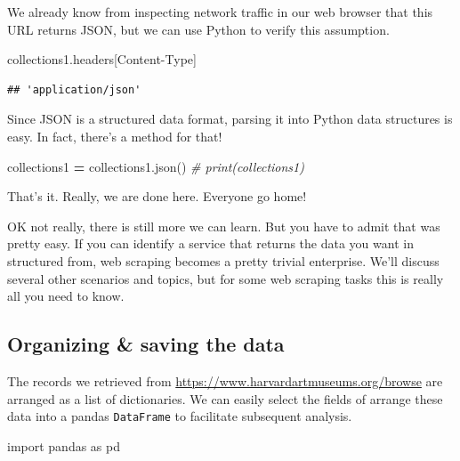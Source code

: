 \documentclass[
]{book}
\newenvironment{Shaded}{\begin{snugshade}}{\end{snugshade}}
\newcommand{\CommentTok}[1]{\textcolor[rgb]{0.56,0.35,0.01}{\textit{#1}}}
\newcommand{\ImportTok}[1]{#1}
\newcommand{\NormalTok}[1]{#1}
\newcommand{\OperatorTok}[1]{\textcolor[rgb]{0.81,0.36,0.00}{\textbf{#1}}}
\newcommand{\StringTok}[1]{\textcolor[rgb]{0.31,0.60,0.02}{#1}}
\begin{document}
We already know from inspecting network traffic in our web browser that this URL returns JSON, but we can use Python to verify this assumption.

\begin{Shaded}
\begin{Highlighting}[]
\NormalTok{collections1.headers[}\StringTok{\textquotesingle{}Content{-}Type\textquotesingle{}}\NormalTok{]}
\end{Highlighting}
\end{Shaded}

\begin{verbatim}
## 'application/json'
\end{verbatim}

Since JSON is a structured data format, parsing it into Python data structures is easy. In fact, there's a method for that!

\begin{Shaded}
\begin{Highlighting}[]
\NormalTok{collections1 }\OperatorTok{=}\NormalTok{ collections1.json()}
\CommentTok{\# print(collections1)}
\end{Highlighting}
\end{Shaded}

That's it. Really, we are done here. Everyone go home!

OK not really, there is still more we can learn. But you have to admit that was pretty easy. If you can identify a service that returns the data you want in structured from, web scraping becomes a pretty trivial enterprise. We'll discuss several other scenarios and topics, but for some web scraping tasks this is really all you need to know.

\hypertarget{organizing-saving-the-data}{%
\subsection{Organizing \& saving the data}\label{organizing-saving-the-data}}

The records we retrieved from \url{https://www.harvardartmuseums.org/browse} are arranged as a list of dictionaries. We can easily select the fields of arrange these data into a pandas \texttt{DataFrame} to facilitate subsequent analysis.

\begin{Shaded}
\begin{Highlighting}[]
\ImportTok{import}\NormalTok{ pandas }\ImportTok{as}\NormalTok{ pd}
\end{Highlighting}
\end{Shaded}
\end{document}
